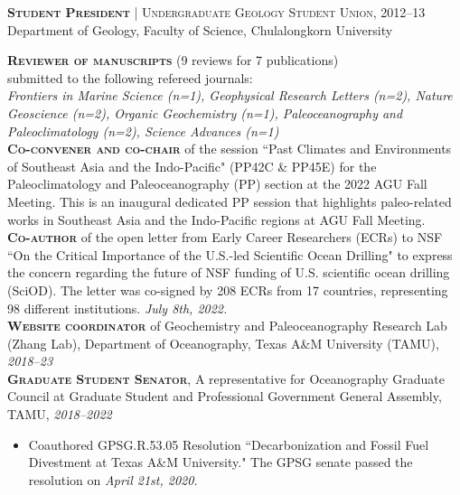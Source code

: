 \documentclass[10pt, letter]{article}
\newcommand{\margintext}[1]{\marginnote{\normalsize\textbf #1 |}}
\begin{document}
\bigskip
\textsc{\textbf{Student President}} | \textsc{Undergraduate Geology Student Union}, 2012–13 \\
Department of Geology, Faculty of Science, Chulalongkorn University

\bigskip
\margintext{Services}
\textsc{\textbf{Reviewer of manuscripts}} (9 reviews for 7 publications)\\submitted to the following refereed journals: \\
\textit{Frontiers in Marine Science (n=1), Geophysical Research Letters (n=2), Nature Geoscience (n=2), Organic Geochemistry (n=1), Paleoceanography and Paleoclimatology (n=2), Science Advances (n=1)} \\

\textsc{\textbf{Co-convener and co-chair}} of the session ``Past Climates and Environments of Southeast Asia and the Indo-Pacific" (PP42C \& PP45E) for the Paleoclimatology and Paleoceanography (PP) section at the 2022 AGU Fall Meeting. This is an inaugural dedicated PP session that highlights paleo-related works in Southeast Asia and the Indo-Pacific regions at AGU Fall Meeting. \\

\textsc{\textbf{Co-author}} of the open letter from Early Career Researchers (ECRs) to NSF ``On the Critical Importance of the U.S.-led Scientific Ocean Drilling" to express the concern regarding the future of NSF funding of U.S. scientific ocean drilling (SciOD). The letter was co-signed by 208 ECRs from 17 countries, representing 98 different institutions. \textit{July 8th, 2022.} \\

\textsc{\textbf{Website coordinator}} of Geochemistry and Paleoceanography Research Lab (Zhang Lab), Department of Oceanography, Texas A\&M University (TAMU), \textit{2018–23} \\

\textsc{\textbf{Graduate Student Senator}}, A representative for Oceanography Graduate Council at Graduate Student and Professional Government General Assembly, TAMU, \textit{2018–2022} \\
\begin{itemize}[noitemsep,nolistsep,leftmargin=*]
    \item Coauthored GPSG.R.53.05 Resolution ``Decarbonization and Fossil Fuel Divestment at Texas A\&M University." The GPSG senate passed the resolution on \textit{April 21st, 2020.}
\end{itemize}
\end{document}

